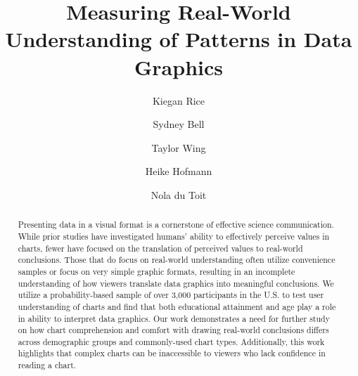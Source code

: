 \documentclass{IEEEcsmag}
\begin{document}

\title{Measuring Real-World Understanding of Patterns in Data Graphics}

\author{Kiegan Rice}

\author{Sydney Bell}

\author{Taylor Wing}

\author{Heike Hofmann}

\author{Nola du Toit}


\begin{abstract}
Presenting data in a visual format is a cornerstone of effective science communication. While prior studies have investigated humans' ability to effectively perceive values in charts, fewer have focused on the translation of perceived values to real-world conclusions. Those that do focus on real-world understanding often utilize convenience samples or focus on very simple graphic formats, resulting in an incomplete understanding of how viewers translate data graphics into meaningful conclusions. We utilize a probability-based sample of over 3,000 participants in the U.S. to test user understanding of charts and find that both educational attainment and age play a role in ability to interpret data graphics. Our work demonstrates a need for further study on how chart comprehension and comfort with drawing real-world conclusions differs across demographic groups and commonly-used chart types. Additionally, this work highlights that complex charts can be inaccessible to viewers who lack confidence in reading a chart.
\end{abstract}
\end{document}
